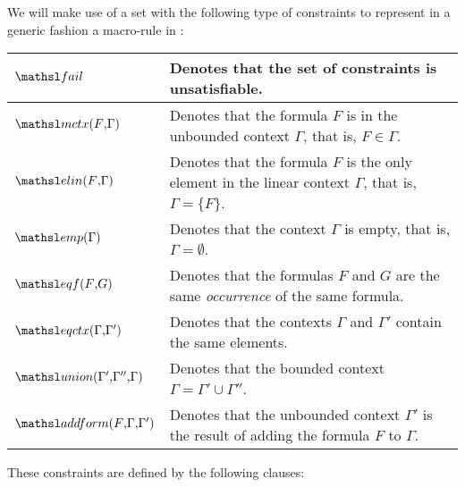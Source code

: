 We will make use of a set with the following type of constraints to
represent in a generic fashion a macro-rule in \sellf:

\vspace{0.5cm}
\begin{tabular}{|l|p{8cm}|}
\hline
$\fail$ & Denotes that the set of constraints is
unsatisfiable.\\
\hline
$\mctx{F}{\Gamma}$ & Denotes that the formula $F$ is in the
unbounded context $\Gamma$, that is, $F \in \Gamma$.\\
\hline
$\elin{F}{\Gamma}$ & Denotes that the formula $F$ is the
only element in the linear context $\Gamma$, that is, $\Gamma = \{F\}$.\\
\hline
$\emp{\Gamma}$ & Denotes that the context $\Gamma$ is empty,
that is, $\Gamma = \emptyset$.\\
\hline
$\eqf{F}{G}$ & Denotes that the formulas $F$ and $G$ are the
same \emph{occurrence} of the same formula.\\
\hline
$\eqctx{\Gamma}{\Gamma'}$ & Denotes that the contexts $\Gamma$ and
$\Gamma'$ contain the same elements.\\
\hline
$\union{\Gamma'} {\Gamma''} {\Gamma}$ & Denotes that the bounded context
$\Gamma = \Gamma' \cup \Gamma''$.\\
\hline
$\addform{F}{\Gamma}{\Gamma'}$ & Denotes that the unbounded context $\Gamma'$ is the result of adding the formula $F$ to $\Gamma$.\\
\hline
\end{tabular}
\vspace{0.5cm}

These constraints are defined by the following clauses:

